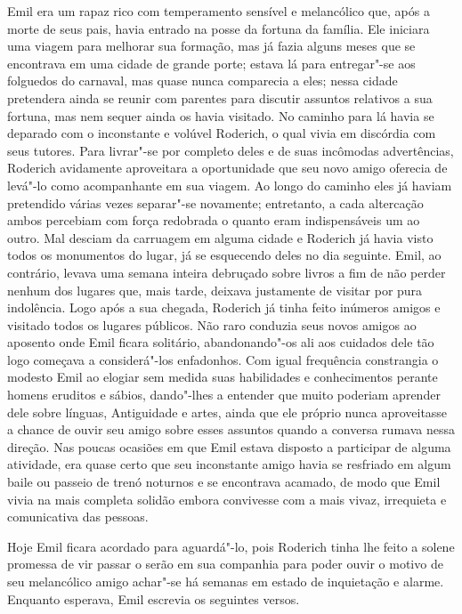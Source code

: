 Emil era um rapaz rico com temperamento sensível e melancólico que, após
a morte de seus pais, havia entrado na posse da fortuna da família. Ele
iniciara uma viagem para melhorar sua formação, mas já fazia alguns
meses que se encontrava em uma cidade de grande porte; estava lá para
entregar"-se aos folguedos do carnaval, mas quase nunca comparecia a
eles; nessa cidade pretendera ainda se reunir com parentes para
discutir assuntos relativos a sua fortuna, mas nem sequer ainda os havia
visitado. No caminho para lá havia se deparado com o inconstante e
volúvel Roderich, o qual vivia em discórdia com seus tutores. Para
livrar"-se por completo deles e de suas incômodas advertências, Roderich
avidamente aproveitara a oportunidade que seu novo amigo oferecia de
levá"-lo como acompanhante em sua viagem. Ao longo do caminho eles já
haviam pretendido várias vezes separar"-se novamente; entretanto, a cada
altercação ambos percebiam com força redobrada o quanto eram
indispensáveis um ao outro. Mal desciam da carruagem em alguma cidade e
Roderich já havia visto todos os monumentos do lugar, já se esquecendo
deles no dia seguinte. Emil, ao contrário, levava uma semana inteira
debruçado sobre livros a fim de não perder nenhum dos lugares que, mais
tarde, deixava justamente de visitar por pura indolência. Logo após a
sua chegada, Roderich já tinha feito inúmeros amigos e visitado todos
os lugares públicos. Não raro conduzia seus novos amigos ao aposento
onde Emil ficara solitário, abandonando"-os ali aos cuidados dele tão
logo começava a considerá"-los enfadonhos. Com igual frequência
constrangia o modesto Emil ao elogiar sem medida suas habilidades e
conhecimentos perante homens eruditos e sábios, dando"-lhes a entender
que muito poderiam aprender dele sobre línguas, Antiguidade e artes,
ainda que ele próprio nunca aproveitasse a chance de ouvir seu amigo
sobre esses assuntos quando a conversa rumava nessa direção. Nas poucas
ocasiões em que Emil estava disposto a participar de alguma atividade,
era quase certo que seu inconstante amigo havia se resfriado em algum
baile ou passeio de trenó noturnos e se encontrava acamado, de modo que
Emil vivia na mais completa solidão embora convivesse com a mais vivaz,
irrequieta e comunicativa das pessoas.

Hoje Emil ficara acordado para aguardá"-lo, pois Roderich tinha lhe feito
a solene promessa de vir passar o serão em sua companhia para poder
ouvir o motivo de seu melancólico amigo achar"-se há semanas em estado
de inquietação e alarme. Enquanto esperava, Emil escrevia os seguintes versos.

